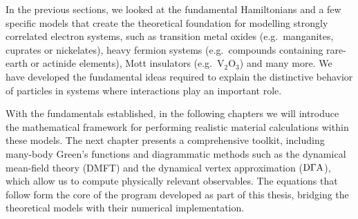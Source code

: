 \documentclass[../../main.tex]{subfiles}
\begin{document}
In the previous sections, we looked at the fundamental Hamiltonians and a few specific models that create the theoretical foundation for modelling strongly correlated electron systems, such as transition metal oxides (e.g.\ manganites, cuprates or nickelates), heavy fermion systems (e.g.\ compounds containing rare-earth or actinide elements), Mott insulators (e.g.\ $\text{V}_2\text{O}_3$) and many more. We have developed the fundamental ideas required to explain the distinctive behavior of particles in systems where interactions play an important role.

With the fundamentals established, in the following chapters we will introduce the mathematical framework for performing realistic material calculations within these models. The next chapter presents a comprehensive toolkit, including many-body Green's functions and diagrammatic methods such as the dynamical mean-field theory (DMFT) and the dynamical vertex approximation ($\text{D}\Gamma\text{A}$), which allow us to compute physically relevant observables. The equations that follow form the core of the program developed as part of this thesis, bridging the theoretical models with their numerical implementation.
\end{document}
